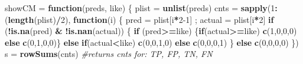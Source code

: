 \documentclass[]{article}
\newenvironment{Shaded}{\begin{snugshade}}{\end{snugshade}}
\newcommand{\CommentTok}[1]{\textcolor[rgb]{0.56,0.35,0.01}{\textit{#1}}}
\newcommand{\ControlFlowTok}[1]{\textcolor[rgb]{0.13,0.29,0.53}{\textbf{#1}}}
\newcommand{\DecValTok}[1]{\textcolor[rgb]{0.00,0.00,0.81}{#1}}
\newcommand{\KeywordTok}[1]{\textcolor[rgb]{0.13,0.29,0.53}{\textbf{#1}}}
\newcommand{\NormalTok}[1]{#1}
\newcommand{\OperatorTok}[1]{\textcolor[rgb]{0.81,0.36,0.00}{\textbf{#1}}}
\newcommand{\StringTok}[1]{\textcolor[rgb]{0.31,0.60,0.02}{#1}}
\begin{document}
\begin{Shaded}
\begin{Highlighting}[]
\NormalTok{showCM =}\StringTok{ }\ControlFlowTok{function}\NormalTok{(preds, like) \{}
\NormalTok{  plist =}\StringTok{ }\KeywordTok{unlist}\NormalTok{(preds)}
\NormalTok{  cnts =}\StringTok{ }\KeywordTok{sapply}\NormalTok{(}\DecValTok{1}\OperatorTok{:}\NormalTok{(}\KeywordTok{length}\NormalTok{(plist)}\OperatorTok{/}\DecValTok{2}\NormalTok{), }\ControlFlowTok{function}\NormalTok{(i) \{}
\NormalTok{    pred =}\StringTok{ }\NormalTok{plist[i}\OperatorTok{*}\DecValTok{2-1}\NormalTok{] ; actual =}\StringTok{ }\NormalTok{plist[i}\OperatorTok{*}\DecValTok{2}\NormalTok{]}
    \ControlFlowTok{if}\NormalTok{ (}\OperatorTok{!}\KeywordTok{is.na}\NormalTok{(pred) }\OperatorTok{&}\StringTok{ }\OperatorTok{!}\KeywordTok{is.nan}\NormalTok{(actual)) \{}
      \ControlFlowTok{if}\NormalTok{ (pred}\OperatorTok{>=}\NormalTok{like) \{}\ControlFlowTok{if}\NormalTok{(actual}\OperatorTok{>=}\NormalTok{like) }\KeywordTok{c}\NormalTok{(}\DecValTok{1}\NormalTok{,}\DecValTok{0}\NormalTok{,}\DecValTok{0}\NormalTok{,}\DecValTok{0}\NormalTok{) }\ControlFlowTok{else} \KeywordTok{c}\NormalTok{(}\DecValTok{0}\NormalTok{,}\DecValTok{1}\NormalTok{,}\DecValTok{0}\NormalTok{,}\DecValTok{0}\NormalTok{)\}}
      \ControlFlowTok{else} \ControlFlowTok{if}\NormalTok{(actual}\OperatorTok{<}\NormalTok{like) }\KeywordTok{c}\NormalTok{(}\DecValTok{0}\NormalTok{,}\DecValTok{0}\NormalTok{,}\DecValTok{1}\NormalTok{,}\DecValTok{0}\NormalTok{) }\ControlFlowTok{else} \KeywordTok{c}\NormalTok{(}\DecValTok{0}\NormalTok{,}\DecValTok{0}\NormalTok{,}\DecValTok{0}\NormalTok{,}\DecValTok{1}\NormalTok{) }
\NormalTok{    \} }\ControlFlowTok{else} \KeywordTok{c}\NormalTok{(}\DecValTok{0}\NormalTok{,}\DecValTok{0}\NormalTok{,}\DecValTok{0}\NormalTok{,}\DecValTok{0}\NormalTok{)}
\NormalTok{  \})}
\NormalTok{  s =}\StringTok{ }\KeywordTok{rowSums}\NormalTok{(cnts)   }\CommentTok{#returns cnts for: TP, FP, TN, FN}


\end{Highlighting}
\end{Shaded}
\end{document}
